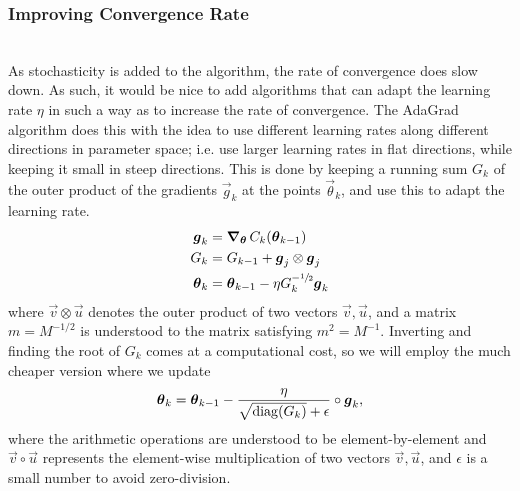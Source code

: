     \subsubsection{Improving Convergence Rate}
        \\
        As stochasticity is added to the algorithm, the rate of convergence does slow down. As such, it would be nice to add algorithms that can adapt the learning rate $\eta$ in such a way as to increase the rate of convergence. The AdaGrad algorithm does this with the idea to use different learning rates along different directions in parameter space; i.e. use larger learning rates in flat directions, while keeping it small in steep directions. This is done by keeping a running sum $G_k$ of the outer product of the gradients $\vec{g}_k$ at the points $\vec{\theta}_k$, and use this to adapt the learning rate.
        \begin{subequations}
            \begin{align}
                \boldsymbol{g}_k &= \operatorname{\operatorname{\boldsymbol{\nabla}}_{\boldsymbol{\theta}}} C_k(\boldsymbol{\theta}_{k-1}) \\
                G_k &= G_{k-1} + \boldsymbol{g}_j \otimes \boldsymbol{g}_j \\
                \boldsymbol{\theta}_k &= \boldsymbol{\theta}_{k-1} - \eta G_k^{-\sfrac{1}{2}} \boldsymbol{g}_k
            \end{align}
        \end{subequations}
        where $\vec{v} \otimes \vec{u}$ denotes the outer product of two vectors $\vec{v}, \vec{u}$, and a matrix $m = M^{-1/2}$ is understood to the matrix satisfying $m^2 = M^{-1}$. Inverting and finding the root of $G_k$ comes at a computational cost, so we will employ the much cheaper version where we update 
        \begin{align}
            \boldsymbol{\theta}_{k} = \boldsymbol{\theta}_{k-1} - \frac{\eta}{\sqrt{\operatorname{diag}(G_k)}+\epsilon} \circ \boldsymbol{g}_k,
        \end{align}
        where the arithmetic operations are understood to be element-by-element and $\vec{v}\circ \vec{u}$ represents the element-wise multiplication of two vectors $\vec{v}, \vec{u}$, and $\epsilon$ is a small number to avoid zero-division.
        
